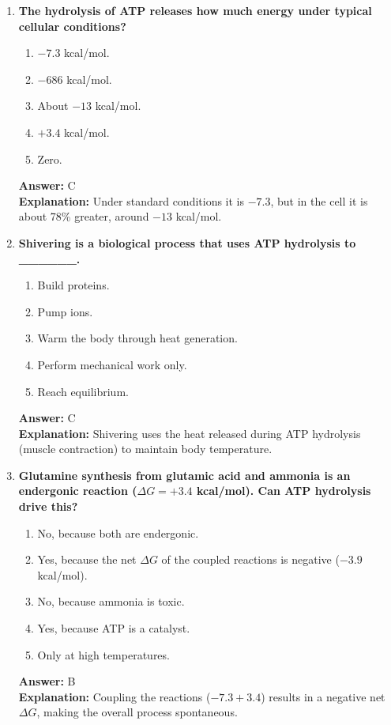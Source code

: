 \documentclass[11pt, a4paper]{article}
\begin{document}
\begin{enumerate}[leftmargin=*, label=\arabic*.]
\item \textbf{The hydrolysis of ATP releases how much energy under typical cellular conditions?}
\begin{enumerate}[label=\Alph*.]
    \item $-7.3$ kcal/mol.
    \item $-686$ kcal/mol.
    \item About $-13$ kcal/mol.
    \item $+3.4$ kcal/mol.
    \item Zero.
\end{enumerate}
\textbf{Answer:} C \\
\textbf{Explanation:} Under standard conditions it is $-7.3$, but in the cell it is about 78\% greater, around $-13$ kcal/mol.

\item \textbf{Shivering is a biological process that uses ATP hydrolysis to \_\_\_\_\_\_.}
\begin{enumerate}[label=\Alph*.]
    \item Build proteins.
    \item Pump ions.
    \item Warm the body through heat generation.
    \item Perform mechanical work only.
    \item Reach equilibrium.
\end{enumerate}
\textbf{Answer:} C \\
\textbf{Explanation:} Shivering uses the heat released during ATP hydrolysis (muscle contraction) to maintain body temperature.

\item \textbf{Glutamine synthesis from glutamic acid and ammonia is an endergonic reaction ($\Delta G = +3.4$ kcal/mol). Can ATP hydrolysis drive this?}
\begin{enumerate}[label=\Alph*.]
    \item No, because both are endergonic.
    \item Yes, because the net $\Delta G$ of the coupled reactions is negative ($-3.9$ kcal/mol).
    \item No, because ammonia is toxic.
    \item Yes, because ATP is a catalyst.
    \item Only at high temperatures.
\end{enumerate}
\textbf{Answer:} B \\
\textbf{Explanation:} Coupling the reactions ($-7.3 + 3.4$) results in a negative net $\Delta G$, making the overall process spontaneous.


\end{enumerate}
\end{document}
